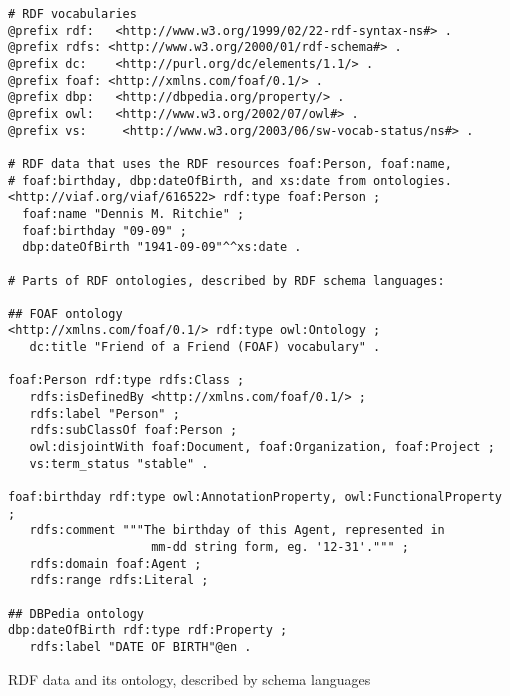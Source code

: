\begin{example}[htp]
\centering
\begin{lstlisting}[language=turtle]
# RDF vocabularies
@prefix rdf:   <http://www.w3.org/1999/02/22-rdf-syntax-ns#> .
@prefix rdfs: <http://www.w3.org/2000/01/rdf-schema#> .
@prefix dc:    <http://purl.org/dc/elements/1.1/> .
@prefix foaf: <http://xmlns.com/foaf/0.1/> .
@prefix dbp:   <http://dbpedia.org/property/> .
@prefix owl:   <http://www.w3.org/2002/07/owl#> .
@prefix vs:     <http://www.w3.org/2003/06/sw-vocab-status/ns#> .

# RDF data that uses the RDF resources foaf:Person, foaf:name,
# foaf:birthday, dbp:dateOfBirth, and xs:date from ontologies.
<http://viaf.org/viaf/616522> rdf:type foaf:Person ;
  foaf:name "Dennis M. Ritchie" ;
  foaf:birthday "09-09" ;
  dbp:dateOfBirth "1941-09-09"^^xs:date .

# Parts of RDF ontologies, described by RDF schema languages:

## FOAF ontology
<http://xmlns.com/foaf/0.1/> rdf:type owl:Ontology ;
   dc:title "Friend of a Friend (FOAF) vocabulary" .

foaf:Person rdf:type rdfs:Class ;
   rdfs:isDefinedBy <http://xmlns.com/foaf/0.1/> ;
   rdfs:label "Person" ;
   rdfs:subClassOf foaf:Person ;
   owl:disjointWith foaf:Document, foaf:Organization, foaf:Project ;
   vs:term_status "stable" .

foaf:birthday rdf:type owl:AnnotationProperty, owl:FunctionalProperty ;
   rdfs:comment """The birthday of this Agent, represented in
                    mm-dd string form, eg. '12-31'.""" ;
   rdfs:domain foaf:Agent ;
   rdfs:range rdfs:Literal ;

## DBPedia ontology
dbp:dateOfBirth rdf:type rdf:Property ;
   rdfs:label "DATE OF BIRTH"@en .
\end{lstlisting}
\caption{RDF data and its ontology, described by  schema languages}
\label{ex:rdfodata}
\end{example}

